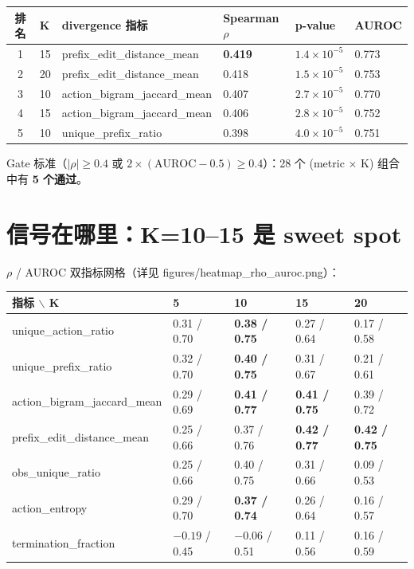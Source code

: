 \documentclass[11pt,a4paper]{article}
\begin{document}
\begin{longtable}{@{}clllll@{}}
\toprule
排名 & K & divergence 指标 & Spearman $\rho$ & p-value & AUROC \\
\midrule
1 & 15 & prefix\_edit\_distance\_mean    & \textbf{0.419} & $1.4\times 10^{-5}$ & 0.773 \\
2 & 20 & prefix\_edit\_distance\_mean    & 0.418 & $1.5\times 10^{-5}$ & 0.753 \\
3 & 10 & action\_bigram\_jaccard\_mean   & 0.407 & $2.7\times 10^{-5}$ & 0.770 \\
4 & 15 & action\_bigram\_jaccard\_mean   & 0.406 & $2.8\times 10^{-5}$ & 0.752 \\
5 & 10 & unique\_prefix\_ratio           & 0.398 & $4.0\times 10^{-5}$ & 0.751 \\
\bottomrule
\end{longtable}

Gate 标准（$|\rho| \geq 0.4$ 或 $2 \times (\text{AUROC}-0.5) \geq 0.4$）：28 个
(metric $\times$ K) 组合中有 \textbf{5 个通过}。

\section{信号在哪里：K=10--15 是 sweet spot}

$\rho$ / AUROC 双指标网格（详见 figures/heatmap\_rho\_auroc.png）：

\begin{longtable}{@{}lllll@{}}
\toprule
指标 $\backslash$ K & 5 & 10 & 15 & 20 \\
\midrule
unique\_action\_ratio         & 0.31 / 0.70 & \textbf{0.38 / 0.75} & 0.27 / 0.64 & 0.17 / 0.58 \\
unique\_prefix\_ratio         & 0.32 / 0.70 & \textbf{0.40 / 0.75} & 0.31 / 0.67 & 0.21 / 0.61 \\
action\_bigram\_jaccard\_mean & 0.29 / 0.69 & \textbf{0.41 / 0.77} & \textbf{0.41 / 0.75} & 0.39 / 0.72 \\
prefix\_edit\_distance\_mean  & 0.25 / 0.66 & 0.37 / 0.76 & \textbf{0.42 / 0.77} & \textbf{0.42 / 0.75} \\
obs\_unique\_ratio            & 0.25 / 0.66 & 0.40 / 0.75 & 0.31 / 0.66 & 0.09 / 0.53 \\
action\_entropy               & 0.29 / 0.70 & \textbf{0.37 / 0.74} & 0.26 / 0.64 & 0.16 / 0.57 \\
termination\_fraction         & $-0.19$ / 0.45 & $-0.06$ / 0.51 & 0.11 / 0.56 & 0.16 / 0.59 \\
\bottomrule
\end{longtable}
\end{document}

